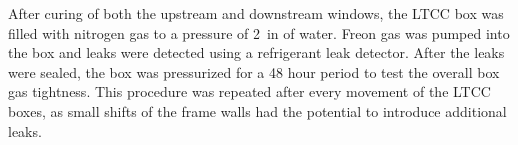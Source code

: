After curing of both the upstream and downstream windows, the LTCC box was filled with nitrogen gas to a pressure of
2~in of water.
Freon gas was pumped into the box and leaks were detected using a refrigerant leak detector. After the leaks were
sealed, the box was pressurized
for a 48 hour period to test the overall box gas tightness. This procedure was repeated after every movement of the LTCC boxes, as small
shifts of the frame walls had the potential to introduce additional leaks.

